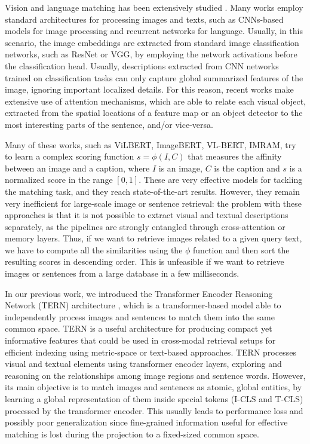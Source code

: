 \documentclass[acmsmall]{acmart}
\newif\ifdraft
\newcommand{\majorrevised}[1]{#1}
\newcommand{\revised}[1]{\ifdraft{\leavevmode\color{blue}{#1}}\else{#1}\fi}
\begin{document}
Vision and language matching has been extensively studied \cite{vsepp2018faghri,carrara2018pictureit,lu2019vilbert,karpathy2015alignment,lee2018stackedcrossattention}.
Many works employ standard architectures for processing images and texts, such as CNNs-based models for image processing and recurrent networks for language.
Usually, in this scenario, the image embeddings are extracted from standard image classification networks, such as ResNet or VGG, by employing the network activations before the classification head. Usually, descriptions extracted from CNN networks trained on classification tasks can only capture global summarized features of the image, ignoring important localized details. \majorrevised{For this reason, recent works make extensive use of attention mechanisms, which are able to relate each visual object, extracted from the spatial locations of a feature map or an object detector to the most interesting parts of the sentence, and/or vice-versa.

\revised{Many of these works, such as ViLBERT\cite{lu2019vilbert}, ImageBERT\cite{qi2020imagebert}, VL-BERT\cite{Su2020VL-BERT}, IMRAM\cite{Chen2020imram}, try to learn a complex scoring function $s = \phi(I, C)$ that measures the affinity between an image and a caption, where $I$ is an image, $C$ is the caption and $s$ is a normalized score in the range $[0, 1]$. These are very effective models for tackling the matching task, and they reach state-of-the-art results. However, they remain very inefficient for large-scale image or sentence retrieval: the problem with these approaches is that it is not possible to extract visual and textual descriptions separately, as the pipelines are strongly entangled through cross-attention or memory layers. Thus, if we want to retrieve images related to a given query text, we have to compute all the similarities using the $\phi$ function and then sort the resulting scores in descending order. This is unfeasible if we want to retrieve images or sentences from a large database in a few milliseconds.}}







In our previous work, we introduced the Transformer Encoder Reasoning Network (TERN) architecture \cite{messina2020tern}, which is a transformer-based model able to independently process images and sentences to match them into the same common space. TERN is a useful architecture for producing compact yet informative features that could be used in cross-modal retrieval setups for efficient indexing using metric-space or text-based approaches.
\majorrevised{TERN processes visual and textual elements using transformer encoder layers, exploring and reasoning on the relationships among image regions and sentence words. However, its main objective is to match images and sentences as atomic, global entities, by learning a global representation of them inside special tokens (I-CLS and T-CLS) processed by the transformer encoder.} This usually leads to performance loss \majorrevised{and possibly poor generalization} since fine-grained information useful for effective matching is lost during the projection to a fixed-sized common space.
\end{document}
